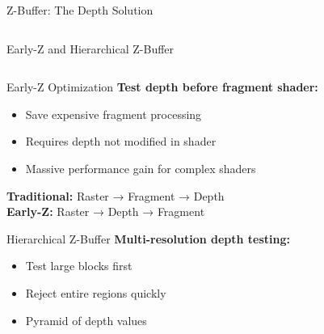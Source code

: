 \begin{frame}{Z-Buffer: The Depth Solution}
\begin{columns}
\begin{column}{0.5\textwidth}
    \end{column}
  \end{columns}
\end{frame}

\begin{frame}{Early-Z and Hierarchical Z-Buffer}
  \begin{columns}
    \begin{column}{0.5\textwidth}
      \begin{conceptbox}{Early-Z Optimization}
        \textbf{Test depth before fragment shader:}
        \begin{itemize}
          \item Save expensive fragment processing
          \item Requires depth not modified in shader
          \item Massive performance gain for complex shaders
        \end{itemize}

        \vspace{0.3cm}
        \textbf{Traditional:} Raster → Fragment → Depth \\
        \textbf{Early-Z:} Raster → Depth → Fragment
      \end{conceptbox}

      \pause
      \begin{raybox}{Hierarchical Z-Buffer}
        \textbf{Multi-resolution depth testing:}
        \begin{itemize}
          \item Test large blocks first
          \item Reject entire regions quickly
          \item Pyramid of depth values
        \end{itemize}
      \end{raybox}
    \end{column}
    \begin{column}{0.5\textwidth}
\end{column}
\end{columns}
\end{frame}
